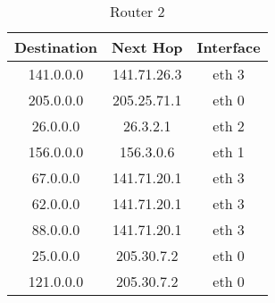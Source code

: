 \documentclass{WeSTassignment}
\begin{document}
\begin{table}[h]
\centering
\caption{Router 2}
\label{Router 2}
\begin{tabular}{ccc}
\hline
\multicolumn{1}{|c|}{\textbf{Destination}} & \multicolumn{1}{c|}{\textbf{Next Hop}} & \multicolumn{1}{c|}{\textbf{Interface}} \\ \hline
141.0.0.0                                  & 141.71.26.3                            & eth 3                                   \\
205.0.0.0                                  & 205.25.71.1                            & eth 0                                   \\
26.0.0.0                                   & 26.3.2.1                               & eth 2                                    \\
156.0.0.0                                  & 156.3.0.6                              & eth 1                                   \\
67.0.0.0                                   & 141.71.20.1                            & eth 3                                   \\
62.0.0.0                                   & 141.71.20.1                            & eth 3                                   \\
88.0.0.0                                   & 141.71.20.1                            & eth 3                                    \\
25.0.0.0                                   & 205.30.7.2                             & eth 0                                   \\
121.0.0.0                                  & 205.30.7.2                             & eth 0                                  
\end{tabular}
\end{table}
\end{document}

